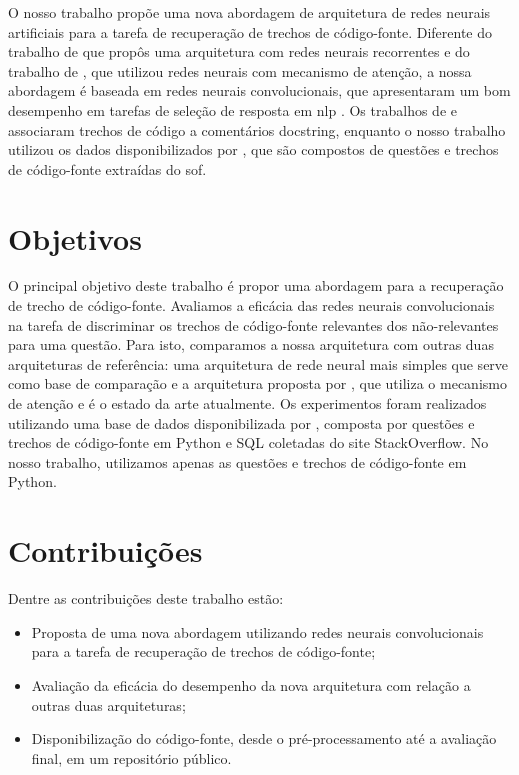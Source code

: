 O nosso trabalho propõe uma nova abordagem de arquitetura de redes neurais artificiais para a tarefa de recuperação de trechos de código-fonte. Diferente do trabalho de \cite{Gu-deep-code-search:2018} que propôs uma arquitetura com redes neurais recorrentes e do trabalho de \cite{cambronero-deep-learning-code-search:2019}, que utilizou redes neurais com mecanismo de atenção, a nossa abordagem é baseada em redes neurais convolucionais, que apresentaram um bom desempenho em tarefas de seleção de resposta em \acrshort{nlp} \citep{feng-2015, tan-lstm-qa, wen-joint-modeling-question-answer-2019}. Os trabalhos de \cite{Gu-deep-code-search:2018} e \cite{cambronero-deep-learning-code-search:2019} associaram trechos de código a comentários \gls{docstring}, enquanto o nosso trabalho utilizou os dados disponibilizados por \cite{yao-2018}, que são compostos de questões e trechos de código-fonte extraídas do \Gls{sof}.

\section{Objetivos}
\label{sec:objetivo}

O principal objetivo deste trabalho é propor uma abordagem  para a recuperação de trecho de código-fonte. Avaliamos a eficácia das redes neurais convolucionais na tarefa de discriminar os trechos de código-fonte relevantes dos não-relevantes para uma questão. Para isto, comparamos a nossa arquitetura com outras duas arquiteturas de referência: uma arquitetura de rede neural mais simples que serve como base de comparação e a arquitetura proposta por \cite{cambronero-deep-learning-code-search:2019}, que utiliza o mecanismo de atenção e é o estado da arte atualmente. Os experimentos foram realizados utilizando uma base de dados disponibilizada por \cite{yao-2018}, composta por questões e trechos de código-fonte em Python e SQL coletadas do site StackOverflow. No nosso trabalho, utilizamos apenas as questões e trechos de código-fonte em Python.

\section{Contribuições}
\label{sec:contribucoes}

Dentre as contribuições deste trabalho estão:

\begin{itemize}
\item Proposta de uma nova abordagem utilizando redes neurais convolucionais para a tarefa de recuperação de trechos de código-fonte;
\item Avaliação da eficácia do desempenho da nova arquitetura com relação a outras duas arquiteturas;
\item Disponibilização do código-fonte, desde o pré-processamento até a avaliação final, em um repositório público.
\end{itemize}

